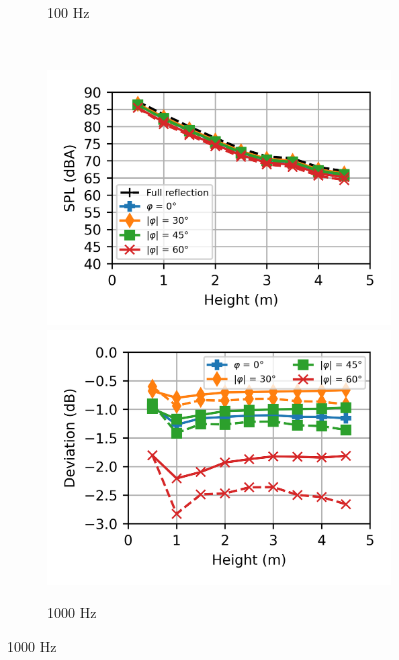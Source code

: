 \begin{figure}[H]
\begin{subfigure}[b]{\textwidth}
		\caption{100 Hz}
	\end{subfigure}
	\\
	\begin{subfigure}[b]{\textwidth}
		\centering
		\includegraphics{fig/chap5/impedance/third_octave/SPL_1000_Hz.png}
		\hfill
		\includegraphics{fig/chap5/impedance/third_octave/deviation_1000_Hz.png}
		\caption{1000 Hz}
	\end{subfigure}
\end{figure}
